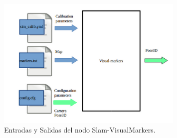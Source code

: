 \begin{figure}[H]
	\begin{center}
		\includegraphics[width=0.8\textwidth]{imag/IMG23.png}
				\caption{Entradas y Salidas del nodo Slam-VisualMarkers.} 
	\label{fig:Entradas y Salidas del nodo.}	
	\end{center}
\end{figure}

